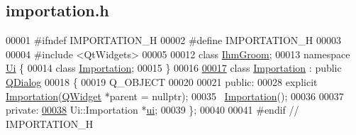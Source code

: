 \hypertarget{importation_8h_source}{}\subsection{importation.\+h}

\begin{DoxyCode}
00001 \textcolor{preprocessor}{#ifndef IMPORTATION\_H}
00002 \textcolor{preprocessor}{#define IMPORTATION\_H}
00003 
00004 \textcolor{preprocessor}{#include <QtWidgets>}
00005 
00012 \textcolor{keyword}{class }\hyperlink{class_ihm_groom}{IhmGroom};
00013 \textcolor{keyword}{namespace }\hyperlink{namespace_ui}{Ui} \{
00014 \textcolor{keyword}{class }\hyperlink{class_importation}{Importation};
00015 \}
00016 
\hyperlink{class_importation}{00017} \textcolor{keyword}{class }\hyperlink{class_importation}{Importation} : \textcolor{keyword}{public} \hyperlink{class_q_dialog}{QDialog}
00018 \{
00019     Q\_OBJECT
00020 
00021 \textcolor{keyword}{public}:
00028     \textcolor{keyword}{explicit} \hyperlink{class_importation}{Importation}(\hyperlink{class_q_widget}{QWidget} *parent = \textcolor{keyword}{nullptr});
00035     ~\hyperlink{class_importation}{Importation}();
00036 
00037 \textcolor{keyword}{private}:
\hyperlink{class_importation_ace5d522c27957bac47fd8d3234af1d2e}{00038}     Ui::Importation *\hyperlink{class_importation_ace5d522c27957bac47fd8d3234af1d2e}{ui};        
00039 \};
00040 
00041 \textcolor{preprocessor}{#endif // IMPORTATION\_H}
\end{DoxyCode}
